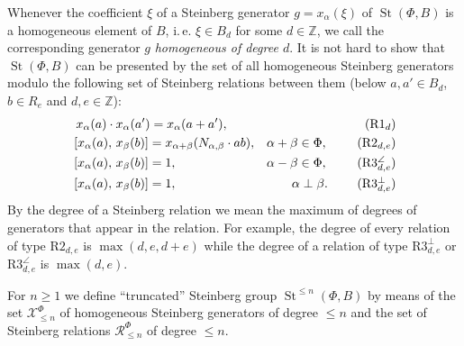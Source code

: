 \documentclass[oneside, 8pt]{amsart}
\theoremstyle{remark}
\theoremstyle{definition}
\numberwithin{lemma}{section}
\numberwithin{prop}{section}
\numberwithin{corollary}{section}
\numberwithin{externaltheorem}{section}
\DeclareMathOperator{\St}{St}
\numberwithin{equation}{section}
\begin{document}
Whenever the coefficient $\xi$ of a Steinberg generator $g = x_\alpha(\xi)$ of $\St(\Phi, B)$ is a homogeneous element of $B$, i.\,e. $\xi \in B_d$ for some $d \in \mathbb{Z}$,
 we call the corresponding generator $g$ {\it homogeneous of degree $d$}.
It is not hard to show that $\St(\Phi, B)$ can be presented by the set of all homogeneous Steinberg generators modulo the following set of Steinberg relations
 between them (below $a, a' \in B_d$, $b\in R_e$ and $d,e \in \mathbb{Z}$): 
\begin{align}
&\,\,x_{\alpha}(a)\cdot x_{\alpha}(a') =  x_{\alpha}(a+a'),                        & \tag{R$1_d$} \\
&\,[x_{\alpha}(a),\,x_{\beta}(b)]= x_{\alpha+\beta}(N_{\alpha, \beta} \cdot ab),   & \alpha + \beta \in \Phi,\ \tag{R$2_{d,e}$} \\
&\,[x_{\alpha}(a),\,x_{\beta}(b)]= 1,                                              & \alpha - \beta \in \Phi,\ \tag{R$3^\angle_{d,e}$} \\
&\,[x_{\alpha}(a),\,x_{\beta}(b)]= 1,                                              & \alpha \perp \beta.\ \tag{R$3^\bot_{d,e}$}
\end{align}
By the degree of a Steinberg relation we mean the maximum of degrees of generators that appear in the relation.
For example, the degree of every relation of type $\text{R2}_{d,e}$ is $\max(d,e,d+e)$ 
 while the degree of a relation of type $\text{R3}^\bot_{d,e}$ or $\text{R3}^\angle_{d,e}$ is $\max(d,e)$.

For $n\geq 1$ we define ``truncated'' Steinberg group $\St^{\leq n}(\Phi, B)$ by means of the set $\mathcal{X}_{\leq n}^\Phi$ of homogeneous Steinberg generators of degree $\leq n$ and the set of Steinberg relations $\mathcal{R}_{\leq n}^\Phi$ of degree $\leq n$.
\end{document}
